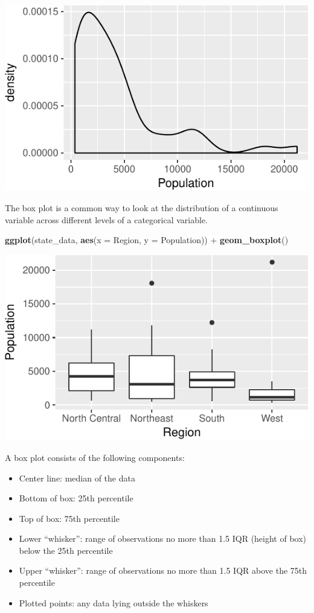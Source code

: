\documentclass[12pt,oneside,openany]{tufte-book}
\newenvironment{Shaded}{}{}
\newcommand{\KeywordTok}[1]{\textcolor[rgb]{0.00,0.44,0.13}{\textbf{{#1}}}}
\newcommand{\DataTypeTok}[1]{\textcolor[rgb]{0.56,0.13,0.00}{{#1}}}
\newcommand{\StringTok}[1]{\textcolor[rgb]{0.25,0.44,0.63}{{#1}}}
\newcommand{\NormalTok}[1]{{#1}}
\providecommand{\tightlist}{%
  \setlength{\itemsep}{0pt}\setlength{\parskip}{0pt}}
\begin{document}
\includegraphics{pdaps_files/figure-latex/density-1}

The box plot is a common way to look at the distribution of a continuous
variable across different levels of a categorical variable.

\begin{Shaded}
\begin{Highlighting}[]
\KeywordTok{ggplot}\NormalTok{(state_data, }\KeywordTok{aes}\NormalTok{(}\DataTypeTok{x =} \NormalTok{Region, }\DataTypeTok{y =} \NormalTok{Population)) +}\StringTok{ }
\StringTok{    }\KeywordTok{geom_boxplot}\NormalTok{()}
\end{Highlighting}
\end{Shaded}

\includegraphics{pdaps_files/figure-latex/boxplot-1}

A box plot consists of the following components:

\begin{itemize}
\tightlist
\item
  Center line: median of the data
\item
  Bottom of box: 25th percentile
\item
  Top of box: 75th percentile
\item
  Lower ``whisker'': range of observations no more than 1.5 IQR (height
  of box) below the 25th percentile
\item
  Upper ``whisker'': range of observations no more than 1.5 IQR above
  the 75th percentile
\item
  Plotted points: any data lying outside the whiskers
\end{itemize}
\end{document}
